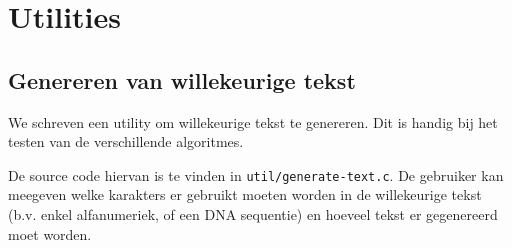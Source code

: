 \documentclass[a4paper,11pt]{article}
\begin{document}
\section{Utilities}

\subsection{Genereren van willekeurige tekst}

We schreven een utility om willekeurige tekst te genereren. Dit is handig bij
het testen van de verschillende algoritmes.

De source code hiervan is te vinden in \verb#util/generate-text.c#. De gebruiker
kan meegeven welke karakters er gebruikt moeten worden in de willekeurige tekst
(b.v. enkel alfanumeriek, of een DNA sequentie) en hoeveel tekst er gegenereerd
moet worden.
\end{document}
